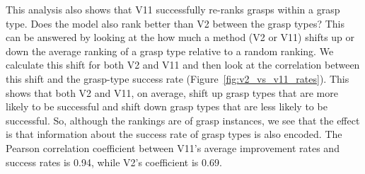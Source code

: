 This analysis also shows that V11 successfully re-ranks grasps within a grasp type. Does the model also rank better than V2 between the grasp types? This can be answered by looking at the how much a method (V2 or V11) shifts up or down the average ranking of a grasp type relative to a random ranking. We calculate this shift for both V2 and V11 and then look at the correlation between this shift and the grasp-type success rate (Figure~\ref{fig:v2_vs_v11_rates}). This shows that both V2 and V11, on average, shift up grasp types that are more likely to be successful and shift down grasp types that are less likely to be successful. So, although the rankings are of grasp instances, we see that the effect is that information about the success rate of grasp types is also encoded. The Pearson correlation coefficient between V11's average improvement rates and success rates is 0.94, while V2's coefficient is 0.69.




